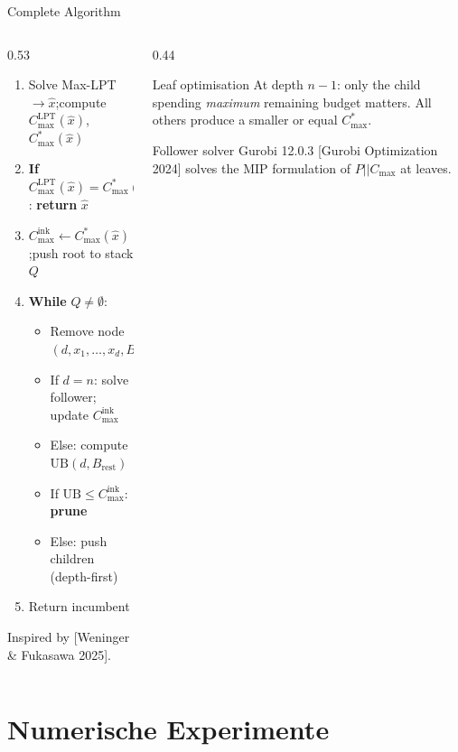 \documentclass[fleqn,11pt,aspectratio=43]{beamer}
\newcommand{\Cmax}{C_{\max}}
\newcommand{\Copt}{C_{\max}^{*}}
\newcommand{\Clpt}{C_{\max}^{\mathrm{LPT}}}
\newcommand{\Cinc}{C_{\max}^{\mathrm{ink}}}
\newcommand{\Brem}{B_{\mathrm{rest}}}
\newcommand{\UB}{\mathrm{UB}}
\begin{document}
\begin{frame}[shrink=5]{Complete Algorithm}
  \begin{columns}[T]
    \begin{column}{0.53\textwidth}
      \small
      \begin{enumerate}
        \item Solve Max-LPT $\to\hat x$;\quad compute $\Clpt(\hat x)$, $\Copt(\hat x)$
        \item \textbf{If} $\Clpt(\hat x)=\Copt(\hat x)$: \textbf{return} $\hat x$
        \item $\Cinc\leftarrow\Copt(\hat x)$;\quad push root to stack $Q$
        \item \textbf{While} $Q\neq\emptyset$:
        \begin{itemize}\small
          \item Remove node $(d,x_1,\ldots,x_d,\Brem)$
          \item If $d=n$: solve follower; update $\Cinc$
          \item Else: compute $\UB(d,\Brem)$
          \item If $\UB\leq\Cinc$: \textbf{prune}
          \item Else: push children (depth-first)
        \end{itemize}
        \item Return incumbent
      \end{enumerate}
      \smallskip
      {\footnotesize Inspired by [Weninger \& Fukasawa 2025].}
    \end{column}
    \begin{column}{0.44\textwidth}
      \begin{block}{Leaf optimisation}
        \small At depth $n{-}1$: only the child spending \emph{maximum} remaining budget matters.
        All others produce a smaller or equal $\Copt$.
      \end{block}
      \begin{block}{Follower solver}
        \small Gurobi 12.0.3 [Gurobi Optimization 2024] solves the MIP formulation of $P||\Cmax$ at leaves.
      \end{block}
    \end{column}
  \end{columns}
\end{frame}

\section{Numerische Experimente}
\end{document}
